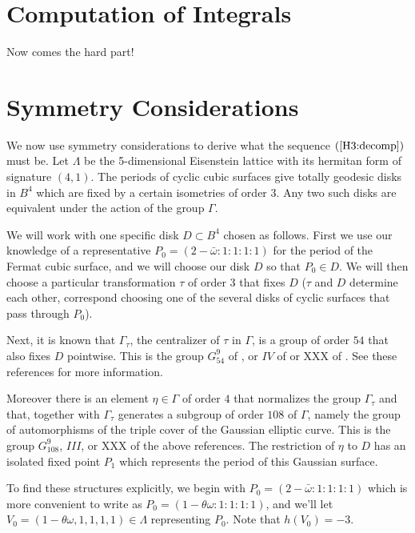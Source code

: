 \section{Computation of Integrals}

Now comes the hard part!

\section{Symmetry Considerations}

We now use symmetry considerations to derive what the sequence $(\ref{H3:decomp})$ must
be. Let $\Lambda$ be the 5-dimensional Eisenstein lattice with its hermitan form of
signature $(4,1)$. The periods of cyclic cubic surfaces give totally geodesic disks in
$B^4$ which are fixed by a certain isometries of order $3$. Any two such disks are
equivalent under the action of the group $\Gamma$.

We will work with one specific disk $D\subset B^4$ chosen as follows. First we use our
knowledge of a representative $P_0 = (2-\bar\omega:1:1:1:1)$ for the period of the
Fermat cubic surface, and we will choose our disk $D$ so that $P_0\in D$. We will then
choose a particular transformation $\tau$ of order $3$ that fixes $D$ ($\tau$ and $D$
determine each other, correspond choosing one of the several disks of cyclic surfaces
that pass through $P_0$).

Next, it is known that $\Gamma_\tau$, the centralizer of $\tau$ in $\Gamma$, is a group
of order $54$ that also fixes $D$ pointwise. This is the group $G_{54}^9$ of
\cite{Hosoh}, or $IV$ of \cite{Dolgachev} or XXX of \cite{Segre}. See these references
for more information.

 Moreover there is an element $\eta\in\Gamma$ of order $4$ that normalizes the group
$\Gamma_\tau$ and that, together with $\Gamma_\tau$ generates a subgroup of order $108$
of $\Gamma$, namely the group of automorphisms of the triple cover of the Gaussian
elliptic curve. This is the group $G_{108}^9$, $III$, or XXX of the above references.
The restriction of $\eta$ to $D$ has an isolated fixed point $P_1$ which represents the
period of this Gaussian surface.

 To find these structures explicitly, we begin with $P_0 = (2 - \bar\omega :1:1:1:1)$
which is more convenient to write as $P_0 = (1- \theta\omega :1:1:1:1)$, and we'll let
$V_0 = (1-\theta\omega,1,1,1,1)\in\Lambda$ representing $P_0$. Note that $h(V_0) = -3$.

